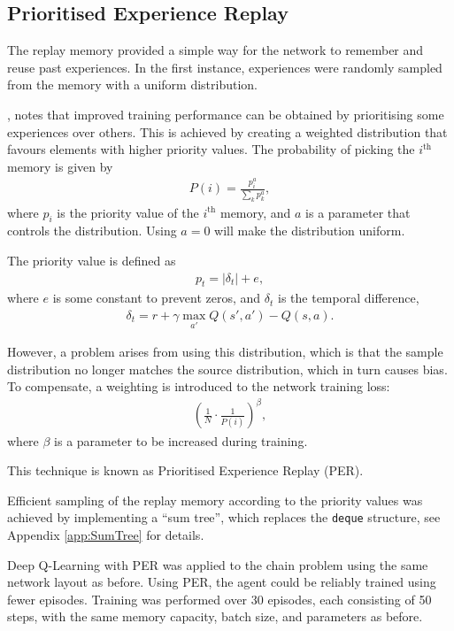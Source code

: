 \subsection{Prioritised Experience Replay}

The replay memory provided a simple way for the network to remember and reuse
past experiences.
In the first instance, experiences were randomly sampled from the memory with a
uniform distribution.

\cite{Schaul:2015:Prioritized}, notes that improved training performance can be
obtained by prioritising some experiences over others.
This is achieved by creating a weighted distribution that favours elements with
higher priority values.
The probability of picking the $i^\text{th}$ memory is given by
\begin{align*}
    P(i) = \frac{p_i^a}{\sum_{k} p_k^a},
\end{align*}
where $p_i$ is the priority value of the $i^\text{th}$ memory, and $a$ is a
parameter that controls the distribution.
Using $a = 0$ will make the distribution uniform.

The priority value is defined as
\begin{align*}
    p_t = \left|\delta_t\right| + e,
\end{align*}
where $e$ is some constant to prevent zeros, and $\delta_t$ is the temporal
difference,
\begin{align*}
    \delta_t = r + \gamma\max_{a'}Q(s',a') - Q(s,a).
\end{align*}

However, a problem arises from using this distribution, which is that the sample
distribution no longer matches the source distribution, which in turn causes
bias.
To compensate, a weighting is introduced to the network training loss:
\begin{align*}
    \left(\frac{1}{N}\cdot\frac{1}{P(i)}\right)^{\beta},
\end{align*}
where $\beta$ is a parameter to be increased during training.

This technique is known as Prioritised Experience Replay (PER).

Efficient sampling of the replay memory according to the priority values was
achieved by implementing a ``sum tree'', which replaces the \texttt{deque}
structure, see Appendix \ref{app:SumTree} for details.

Deep Q-Learning with PER was applied to the chain problem using the same
network layout as before.
Using PER, the agent could be reliably trained using fewer episodes.
Training was performed over 30 episodes, each consisting of 50 steps, with the
same memory capacity, batch size, and parameters as before.




